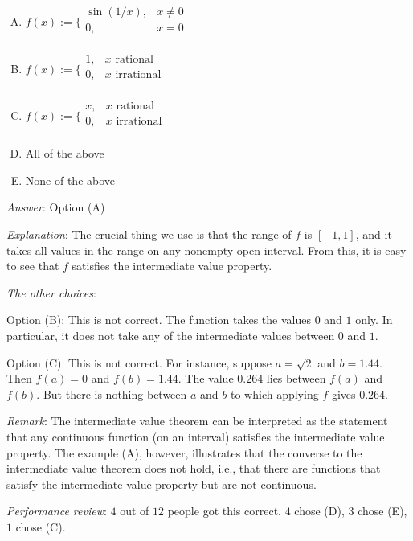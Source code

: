 \documentclass[10pt]{amsart}
\begin{document}
\begin{enumerate}
  \begin{enumerate}[(A)]

  \item $f(x) := \lbrace\begin{array}{rl} \sin(1/x), & x \ne 0\\ 0, & x = 0 \\\end{array}$
  \item $f(x) := \lbrace\begin{array}{rl} 1, & x \text{ rational} \\0, & x \text{ irrational}\\\end{array}$
  \item $f(x) := \lbrace\begin{array}{rl} x, & x \text{ rational} \\0, & x \text{ irrational}\\\end{array}$
  \item All of the above
  \item None of the above
  \end{enumerate}

  {\em Answer}: Option (A)

  {\em Explanation}: The crucial thing we use is that the range of $f$
  is $[-1,1]$, and it takes all values in the range on any nonempty
  open interval. From this, it is easy to see that $f$ satisfies the
  intermediate value property.

  {\em The other choices}:

  Option (B): This is not correct. The function takes the values $0$
  and $1$ only. In particular, it does not take any of the
  intermediate values between $0$ and $1$.

  Option (C): This is not correct. For instance, suppose $a =
  \sqrt{2}$ and $b = 1.44$. Then $f(a) = 0$ and $f(b) = 1.44$. The
  value $0.264$ lies between $f(a)$ and $f(b)$. But there is nothing
  between $a$ and $b$ to which applying $f$ gives $0.264$.

  {\em Remark}: The intermediate value theorem can be interpreted as
  the statement that any continuous function (on an interval)
  satisfies the intermediate value property. The example (A), however,
  illustrates that the converse to the intermediate value theorem does
  not hold, i.e., that there are functions that satisfy the
  intermediate value property but are not continuous.

  {\em Performance review}: $4$ out of $12$ people got this
  correct. $4$ chose (D), $3$ chose (E), $1$ chose (C).


\end{enumerate}
\end{document}
